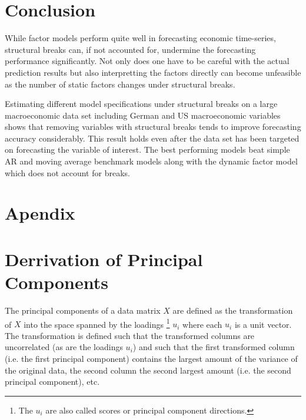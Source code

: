 \documentclass[12pt]{article}
\begin{document}
\clearpage
\section{Conclusion}
While factor models perform quite well in forecasting economic time-series, structural breaks can, if not accounted for, undermine the forecasting performance significantly. Not only does one have to be careful with the actual prediction results but also interpretting the factors directly can become unfeasible as the number of static factors changes under structural breaks.

Estimating different model specifications under structural breaks on a large macroeconomic data set including German and US macroeconomic variables shows that removing variables with structural breaks tends to improve forecasting accuracy considerably. This result holds even after the data set has been targeted on forecasting the variable of interest. The best performing models beat simple AR and moving average benchmark models along with the dynamic factor model which does not account for breaks.


\clearpage
\newpage
\appendix
\section*{Apendix}

\section{Derrivation of Principal Components}
\label{Derrivation of Principal Components}
The principal components of a data matrix $X$ are defined as the transformation of $X$ into the space spanned by the loadings \footnote{The $u_i$ are also called scores or principal component directions.} $u_i$ where each $u_i$ is a unit vector. The transformation is defined such that the transformed columns are uncorrelated (as are the loadings $u_i$) and such that the first transformed column (i.e. the first principal component) contains the largest amount of the variance of the original data, the second column the second largest amount (i.e. the second principal component), etc. \\
\end{document}
